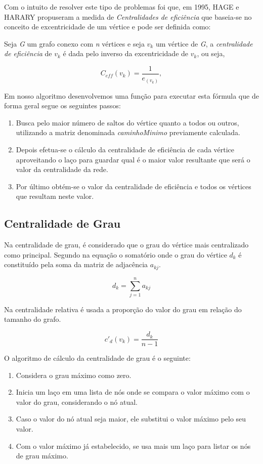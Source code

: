 \documentclass[12pt]{article}
\begin{document}
Com o intuito de resolver este tipo de problemas foi que, em 1995,  HAGE e HARARY propuseram a medida de {\it Centralidades de eficiência} que baseia-se no conceito de excentricidade de um vértice e pode ser definida como: 

Seja  {\it G} um grafo conexo com {\it n} vértices  e seja $v_k$ um vértice de {\it G}, a {\it centralidade de eficiência} de $v_k$ é dada pelo inverso da excentricidade de $v_k$, ou seja,
\begin{center}
\begin{equation}
C_{eff}(v_k)= \frac{1}{e_{(v_k)}},
\end{equation}
\end{center}
Em nosso algoritmo desenvolvemos uma função para executar esta fórmula que de forma geral segue os seguintes passos:
\begin{enumerate}
\item Busca pelo maior número de saltos do vértice quanto a todos ou outros, utilizando a matriz denominada {\it caminhoMinimo} previamente calculada.
\item Depois efetua-se o cálculo da centralidade de eficiência de cada vértice aproveitando o laço para guardar qual é o maior valor resultante que será o valor da centralidade da rede.
\item Por último obtém-se o valor da centralidade de eficiência e todos os vértices que resultam neste valor. 
\end{enumerate} 
   
\subsection{Centralidade de Grau}
Na centralidade de grau, é considerado que o grau do vértice mais centralizado como principal.
Segundo \cite{freitas} na equação o somatório onde o grau do vértice $d_{k}$ é constituído pela soma da matriz de adjacência $a_{kj}$.
\begin{center}
\begin{equation}
d_{k}= \sum_{j=1}^{n}a_{kj}
\end{equation}
\end{center}
Na centralidade relativa é usada a proporção do valor do grau em relação do tamanho do grafo.
\begin{center}
\begin{equation}
{c}'_{d}(v_{k})=\frac{d_k}{n-1}
\end{equation}
\end{center}
O algoritmo de cálculo da centralidade de grau é o seguinte:
\begin{enumerate}
\item Considera o grau máximo como zero.
\item Inicia um laço em uma lista de nós onde se compara o valor máximo com o valor do grau, considerando o nó atual.
\item Caso o valor do nó atual seja maior, ele substitui o valor máximo pelo seu valor.
\item Com o valor máximo já estabelecido, se usa mais um laço para listar os nós de grau máximo.
\end{enumerate}
\end{document}
